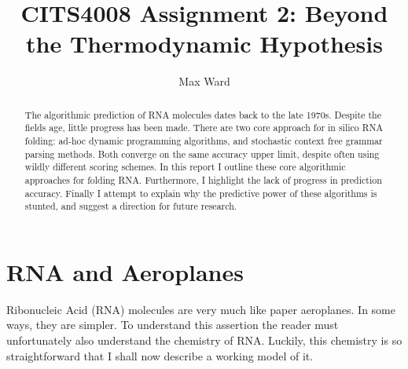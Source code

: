 \documentclass[12pt, a4paper]{article}
\title{CITS4008 Assignment 2: Beyond the Thermodynamic Hypothesis}
\author{Max Ward}
\begin{document}
\maketitle

\begin{abstract}
The algorithmic prediction of RNA molecules dates back to the late 1970s. Despite the fields age, little progress has been made. There are two core approach for in silico RNA folding: ad-hoc dynamic programming algorithms, and stochastic context free grammar parsing methods. Both converge on the same accuracy upper limit, despite often using wildly different scoring schemes. In this report I outline these core algorithmic approaches for folding RNA. Furthermore, I highlight the lack of progress in prediction accuracy. Finally I attempt to explain why the predictive power of these algorithms is stunted, and suggest a direction for future research.
\end{abstract}

\clearpage

\tableofcontents
\listoffigures
\clearpage

\section{RNA and Aeroplanes} 
Ribonucleic Acid (RNA) molecules are very much like paper aeroplanes. In some ways, they are simpler. To understand this assertion the reader must unfortunately also understand the chemistry of RNA. Luckily, this chemistry is so straightforward that I shall now describe a working model of it.
\end{document}
